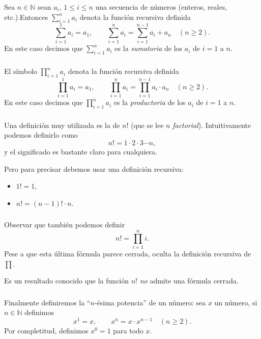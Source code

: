 \documentclass[handout]{beamer} %
\begin{document}
\begin{frame}\frametitle{} 
\begin{definicion} Sea $n \in \mathbb N$ sean $a_i$,  $1 \le i \le n$ una secuencia de números (enteros, reales, etc.).\pause  Entonces $\sum_{i=1}^{n} a_i$  denota la función recursiva definida  \pause 
	$$
	\sum_{i=1}^{1} a_i= a_1, \qquad \sum_{i=1}^{n} a_i = \sum_{i=1}^{n-1} a_i+ a_{n} \quad (n\ge 2).
	$$\pause 
	En  este caso  decimos que  $\displaystyle\sum_{i=1}^{n} a_i$ es la \textit{sumatoria} de los $a_i$ de $i=1$  a $n$. 
\end{definicion}
	
\end{frame}


\begin{frame}\frametitle{} 
\begin{definicion}
	El símbolo $\displaystyle\prod_{i=1}^{n} a_i$ denota la función recursiva definida  \pause 
	$$
	\prod_{i=1}^{1} a_i= a_1, \qquad \prod_{i=1}^{n} a_i = \prod_{i=1}^{n-1} a_i \cdot  a_{n} \quad (n\ge 2).
	$$\pause 
	En  este caso  decimos que  $\displaystyle\prod_{i=1}^{n} a_i$ es la \textit{productoria} de los $a_i$ de $i=1$  a $n$. 
\end{definicion}
	


\end{frame}



\begin{frame}\frametitle{} 
	Una definición muy utilizada es la de  $n!$ (que se lee $n$ {\it factorial}). Intuitivamente podemos definirlo como \pause 
	$$
	n!=1 \cdot 2 \cdot 3 \cdots n,
	$$\pause 
	y el significado es bastante claro para cualquiera.
	
	\medspace \pause 
	
	Pero para precisar debemos usar una definición recursiva:
	\pause 
	\begin{itemize}
		\item $1! = 1$, \pause 
		\item $n! = (n-1)! \cdot n$.
	\end{itemize}
	
	
	
\end{frame}


\begin{frame}\frametitle{} 	
	Observar que también podemos definir 
	\pause 
	$$n! = \prod_{i=1}^{n} i.$$ 
	\pause 
	Pese a que esta última fórmula parece cerrada, oculta la definición recursiva de $\prod$.
	
	\medspace 
	
	\pause 
	Es un resultado conocido  que la función $n!$ \textit{no} admite  una fórmula cerrada. 
	
\end{frame}


\begin{frame}\frametitle{} 	




 Finalmente definiremos  la ``$n$-ésima potencia'' de un número: sea $x$ un  número, si $n \in \mathbb N $ definimos\pause 
 $$
 x^1=x,\qquad x^n= x \cdot x^{n-1} \quad (n\ge 2).
 $$\pause 
 Por completitud,  definimos $x^0=1$ para todo $x$. 

\end{frame}
\end{document}
